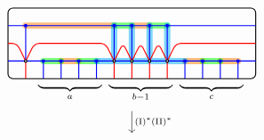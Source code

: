 \[
\begin{tikzcd}
\begin{tikzpicture}[baseline=-.5ex,scale=1]
\draw[thick, rounded corners] (-4,-1) rectangle (3,1);
\begin{scope}
\clip (-4,-1) rectangle (3,1);
%
\draw[color=cyclecolor1, line cap=round, line width=5, opacity=0.5] (-3.5,0.5) -- (-1, 0.5) (-2.5,-0.5) -- (-2,-0.5) (-0.5, 0.5) -- (0, 0.5) (1, -0.5) -- (1.5, -0.5) (2, -0.5) -- (2.5, -0.5);
\draw[color=cyclecolor2, line cap=round, line width=5, opacity=0.5] (-3,-0.5) -- (-2.5,-0.5) (-2, -0.5) -- (-1.5, -0.5) (-1, 0.5) -- (-0.5, 0.5) (0,0.5) -- (0.5,0.5) (1.5, -0.5) -- (2, -0.5);
\draw[color=cyan, line cap=round, line width=5, opacity=0.5] (-1, 0.5) -- (-1, -0.5)
(-1, -0.5) -- (1, -0.5)
(-0.5, 0.5) -- (-0.5, -0.5)
(0, 0.5) -- (0, -0.5)
(0.5, -0.5) -- (0.5, 0.5)
 (-1.5,-0.5) -- (-1,-0.5);
%
\draw[thick, blue] 
(-4,-0.5) -- (4, -0.5)
(-4, 0.5) -- (4, 0.5)
;
%
\draw[thick, blue, fill] 
(-3.5, -0.5) -- (-3.5, 0.5) circle (1pt)
(-3, -1) -- (-3, -0.5) circle (1pt)
(-2.5, -1) -- (-2.5, -0.5) circle (1pt)
(-2, -1) -- (-2, -0.5) circle (1pt)
(-1.5,-1) -- (-1.5,-0.5) circle (1pt)
(-1, -0.5) -- (-1, 0.5) circle (1pt)
(-0.5, -0.5) -- (-0.5, 0.5) circle (1pt)
(0, -0.5) -- (0, 0.5) circle (1pt)
(0.5, -0.5) -- (0.5, 0.5) circle (1pt)
(1, -1) -- (1, -0.5) circle (1pt)
(1.5, -1) -- (1.5, -0.5) circle (1pt)
(2, -1) -- (2, -0.5) circle (1pt)
(2.5, -1) -- (2.5,-0.5) circle (1pt);
%
\draw[thick, red] (-3.5,-1) -- (-3.5,-0.5) (-1, -1) -- (-1, -0.5) (-0.5,-1) -- (-0.5, -0.5) (0,-0.5) -- (0, -1) (0.5, -1) -- (0.5,-0.5);
\draw[thick, red, rounded corners] (-4,0) -- (-3.75,0) -- (-3.5,-0.5) (-3.5, -0.5) -- (-3.25, 0) -- (-1.25, 0) -- (-1, -0.5) 
(-1, -0.5) -- (-0.75, 0) -- (-0.5, -0.5) 
(-0.5, -0.5) -- (-0.25, 0) -- (0, -0.5)
(0, -0.5) -- (0.25,0) -- (0.5,-0.5)
(0.5, -0.5) -- (0.75, 0) -- (1, 0) -- (3,0);
\foreach \x in {-3.5, -1, -0.5, 0, 0.5} {
\draw[thick, fill=white] (\x,-0.5) circle (1pt) ;
}
\end{scope}
\draw (-2.25, -1) node[below] {$\underbrace{\hphantom{\hspace{1.8cm}}}_{a}$};
\draw (-.25, -1) node[below] {$\underbrace{\hphantom{\hspace{1.8cm}}}_{b-1}$};
\draw (1.75, -1) node[below] {$\underbrace{\hphantom{\hspace{1.8cm}}}_{c}$};
\end{tikzpicture}
\arrow[d, "\Move{I}^*\Move{II}^*"]\\
\begin{tikzpicture}[baseline=-.5ex,scale=1]

\end{tikzpicture}
\end{tikzcd}\]
